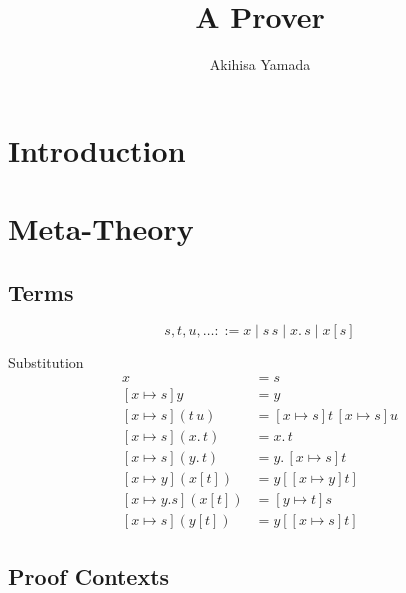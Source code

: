 \documentclass{lipics-v2021}
\title{A Prover}
\author{Akihisa Yamada}{AIST}{}{}{}
\makeatletter
\def\tp@#1#2{\@ifnextchar[{\tp@@{#1}{#2}}{\tp@@@{#1}{#2}}}
\def\tp@@#1#2[#3]#4{\mathopen{#3#1}\def\mid{\mathrel{#3|}}#4\mathclose{#3#2}}
\def\tp@@@#1#2#3{\bgroup\left#1\def\mid{\;\middle|\;}#3\right#2\egroup}
\def\set{\tp@\{\}}
\newcommand\Term{\mathcal{T}}
\makeatother
\begin{document}
\maketitle

\begin{abstract}
\end{abstract}

\section{Introduction}

\section{Meta-Theory}

\subsection{Terms}

\[ s,t,u,\ldots ::= x \mid s\,s \mid x.\,s \mid x[s]
\]


Substitution
\begin{align*}
[x\mapsto s]x &= s\\
[x\mapsto s]y &= y \\
[x\mapsto s](t\,u) &= [x\mapsto s]t\,[x\mapsto s]u\\
[x\mapsto s](x.\,t) &= x.\,t\\
[x\mapsto s](y.\,t) &= y.\,[x\mapsto s]t\\
[x\mapsto y](x[t]) &= y[[x\mapsto y]t]\\
[x\mapsto y.s](x[t]) &= [y\mapsto t]s\\
[x\mapsto s](y[t]) &= y[[x\mapsto s]t]
\end{align*}


\subsection{Proof Contexts}
\end{document}
